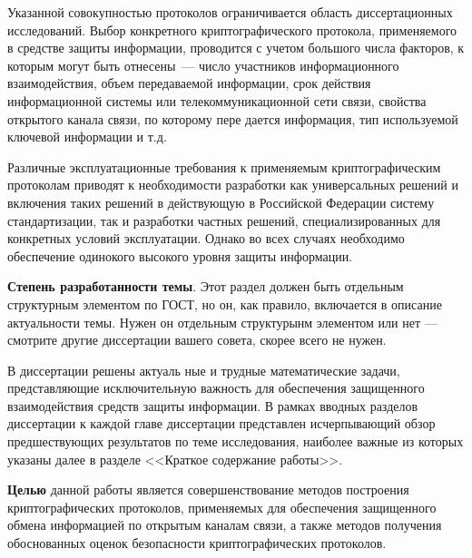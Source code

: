\documentclass[12pt]{extarticle}
\begin{document}
Указанной совокупностью протоколов ограничивается область диссертационных исследований.
Выбор конкретного криптографического протокола, применяемого в средстве защиты информации, проводится с учетом большого числа факторов, к которым могут быть отнесены~--- число участников информационного взаимодействия, объем передаваемой информации, срок действия информационной системы или телекоммуникационной сети связи, свойства открытого канала связи, по которому пере дается информация, тип используемой ключевой информации и т.д.

Различные эксплуатационные требования к применяемым криптографическим протоколам приводят к необходимости разработки как универсальных решений и включения таких решений в действующую в Российской Федерации систему стандартизации, так и разработки частных решений, специализированных для конкретных условий эксплуатации.
Однако во всех случаях необходимо обеспечение одинокого высокого уровня защиты информации.

\textbf{Степень разработанности темы}.
Этот раздел должен быть отдельным структурным элементом по ГОСТ, но он, как правило, включается в описание актуальности темы.
Нужен он отдельным структурынм элементом или нет --- смотрите другие диссертации вашего совета, скорее всего не нужен.

В диссертации решены актуаль ные и трудные математические задачи, представляющие исключительную важность для обеспечения защищенного взаимодействия средств защиты информации.
В рамках вводных разделов диссертации к каждой главе диссертации представлен исчерпывающий обзор предшествующих результатов по теме исследования, наиболее важные из которых указаны далее в разделе {}<<Краткое содержание работы>>{}.

\textbf{Целью} данной работы является совершенствование методов построения криптографических протоколов, применяемых для обеспечения защищенного обмена информацией по открытым каналам связи, а также методов получения обоснованных оценок безопасности криптографических протоколов.
\end{document}
